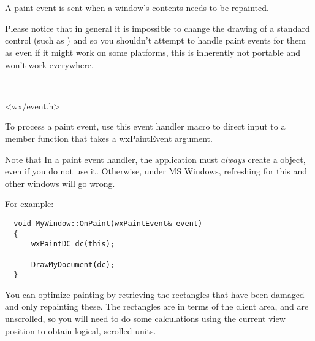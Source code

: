\section{}\label{wxpaintevent}

A paint event is sent when a window's contents needs to be repainted.

Please notice that in general it is impossible to change the drawing of a
standard control (such as ) and so you shouldn't
attempt to handle paint events for them as even if it might work on some
platforms, this is inherently not portable and won't work everywhere.


\\


<wx/event.h>


To process a paint event, use this event handler macro to direct input to a member
function that takes a wxPaintEvent argument.

\twocolwidtha{7cm}
\begin{twocollist}\itemsep=0pt
\end{twocollist}%




Note that In a paint event handler, the application must {\it always} create a  object,
even if you do not use it. Otherwise, under MS Windows, refreshing for this and other windows will go wrong.

For example:

\small{%
\begin{verbatim}
  void MyWindow::OnPaint(wxPaintEvent& event)
  {
      wxPaintDC dc(this);

      DrawMyDocument(dc);
  }
\end{verbatim}
}%

You can optimize painting by retrieving the rectangles
that have been damaged and only repainting these. The rectangles are in
terms of the client area, and are unscrolled, so you will need to do
some calculations using the current view position to obtain logical,
scrolled units.

